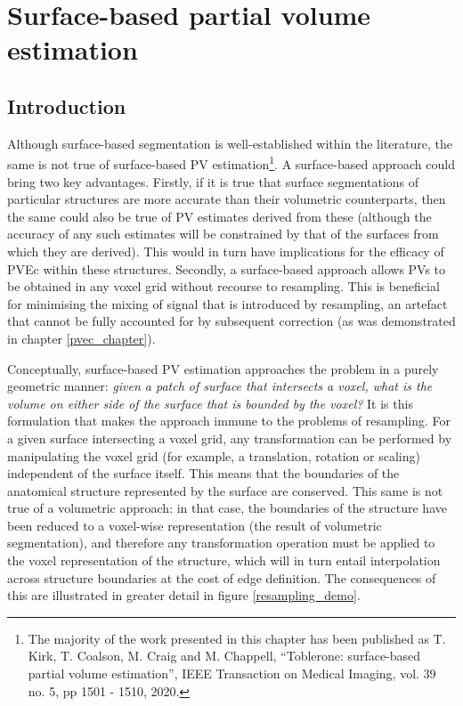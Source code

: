  

\chapter[Surface-based PV estimation]{Surface-based partial volume estimation}
\label{tob_pv_chapter}

\section{Introduction}

Although surface-based segmentation is well-established within the literature, the same is not true of surface-based PV estimation\footnote{The majority of the work presented in this chapter has been published as T. Kirk, T. Coalson, M. Craig and M. Chappell, ``Toblerone: surface-based partial volume estimation'', IEEE Transaction on Medical Imaging, vol. 39 no. 5, pp 1501 - 1510, 2020.}. A surface-based approach could bring two key advantages. Firstly, if it is true that surface segmentations of particular structures are more accurate than their volumetric counterparts, then the same could also be true of PV estimates derived from these (although the accuracy of any such estimates will be constrained by that of the surfaces from which they are derived). This would in turn have implications for the efficacy of PVEc within these structures. Secondly, a surface-based approach allows PVs to be obtained in any voxel grid without recourse to resampling. This is beneficial for minimising the mixing of signal that is introduced by resampling, an artefact that cannot be fully accounted for by subsequent correction (as was demonstrated in chapter \ref{pvec_chapter}). 

Conceptually, surface-based PV estimation approaches the problem in a purely geometric manner: \textit{given a patch of surface that intersects a voxel, what is the volume on either side of the surface that is bounded by the voxel?} It is this formulation that makes the approach immune to the problems of resampling. For a given surface intersecting a voxel grid, any transformation can be performed by manipulating the voxel grid (for example, a translation, rotation or scaling) independent of the surface itself. This means that the boundaries of the anatomical structure represented by the surface are conserved. This same is not true of a volumetric approach: in that case, the boundaries of the structure have been reduced to a voxel-wise representation (the result of volumetric segmentation), and therefore any transformation operation must be applied to the voxel representation of the structure, which will in turn entail interpolation across structure boundaries at the cost of edge definition. The consequences of this are illustrated in greater detail in figure \ref{resampling_demo}. 


